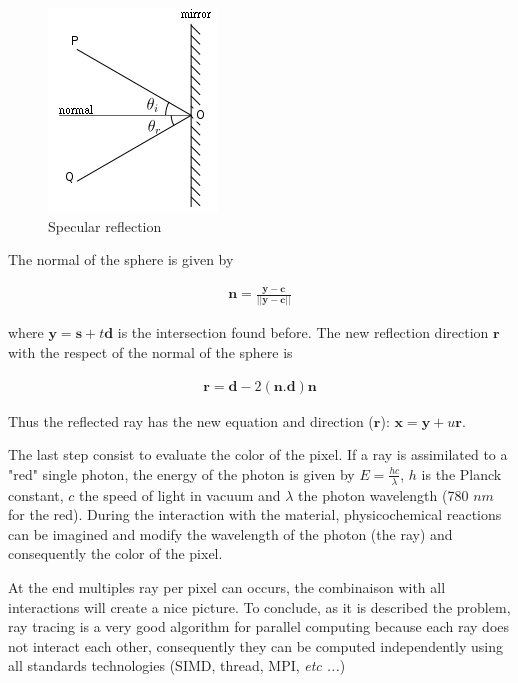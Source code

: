 \documentclass[11pt]{amsart}
\begin{document}
\begin{figure}[htbp]
\begin{center}
\includegraphics[scale=0.5]{170px-Reflection_angles}
\caption{Specular reflection \label{fig3}}
\end{center}
\end{figure}

The normal of the sphere is given by

\begin{eqnarray}
\mathbf{n} = \frac{\mathbf{y} - \mathbf{c}}{||\mathbf{y} - \mathbf{c}||} \nonumber
\end{eqnarray}

where $\mathbf{y}  =  \mathbf{s} + t\mathbf{d}$ is the intersection found before. The new reflection direction $\mathbf{r}$ with the respect of the normal of the sphere is 

\begin{eqnarray}
\mathbf{r} = \mathbf{d} - 2(\mathbf{n}.\mathbf{d})\mathbf{n} \nonumber
\end{eqnarray}

Thus the reflected ray has the new equation and direction ($\mathbf{r}$): $\mathbf{x}  =  \mathbf{y} + u\mathbf{r}$.

The last step consist to evaluate the color of the pixel. If a ray is assimilated to a "red" single photon, the energy of the photon
is given by $E = \frac{hc}{\lambda}$, $h$ is the Planck constant, $c$ the speed of light in vacuum and $\lambda$ the photon wavelength 
(780 $nm$ for the red). During the interaction with the material, physicochemical reactions can be imagined and modify the wavelength of
the photon (the ray) and consequently the color of the pixel. 

At the end multiples ray per pixel can occurs, the combinaison with all interactions will create a nice picture. 
To conclude, as  it is described the problem, ray tracing is a very good algorithm for parallel computing because each ray does not interact each other,
consequently they can be computed independently using all standards technologies (SIMD, thread, MPI, {\it etc ...})
\end{document}
